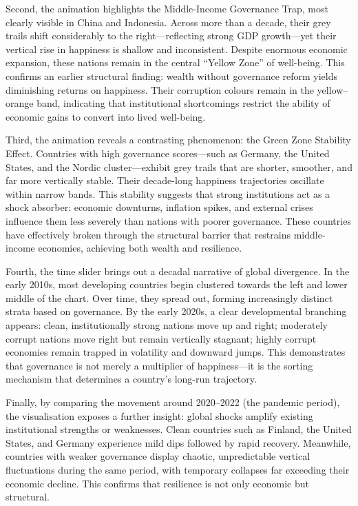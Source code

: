 \documentclass[conference]{IEEEtran}
\begin{document}
Second, the animation highlights the Middle-Income Governance Trap, most clearly visible in China and Indonesia. Across more than a decade, their grey trails shift considerably to the right—reflecting strong GDP growth—yet their vertical rise in happiness is shallow and inconsistent. Despite enormous economic expansion, these nations remain in the central “Yellow Zone” of well-being. This confirms an earlier structural finding: wealth without governance reform yields diminishing returns on happiness. Their corruption colours remain in the yellow–orange band, indicating that institutional shortcomings restrict the ability of economic gains to convert into lived well-being.

Third, the animation reveals a contrasting phenomenon: the Green Zone Stability Effect. Countries with high governance scores—such as Germany, the United States, and the Nordic cluster—exhibit grey trails that are shorter, smoother, and far more vertically stable. Their decade-long happiness trajectories oscillate within narrow bands. This stability suggests that strong institutions act as a shock absorber: economic downturns, inflation spikes, and external crises influence them less severely than nations with poorer governance. These countries have effectively broken through the structural barrier that restrains middle-income economies, achieving both wealth and resilience.

Fourth, the time slider brings out a decadal narrative of global divergence. In the early 2010s, most developing countries begin clustered towards the left and lower middle of the chart. Over time, they spread out, forming increasingly distinct strata based on governance. By the early 2020s, a clear developmental branching appears: clean, institutionally strong nations move up and right; moderately corrupt nations move right but remain vertically stagnant; highly corrupt economies remain trapped in volatility and downward jumps. This demonstrates that governance is not merely a multiplier of happiness—it is the sorting mechanism that determines a country’s long-run trajectory.

Finally, by comparing the movement around 2020–2022 (the pandemic period), the visualisation exposes a further insight: global shocks amplify existing institutional strengths or weaknesses. Clean countries such as Finland, the United States, and Germany experience mild dips followed by rapid recovery. Meanwhile, countries with weaker governance display chaotic, unpredictable vertical fluctuations during the same period, with temporary collapses far exceeding their economic decline. This confirms that resilience is not only economic but structural.
\end{document}
